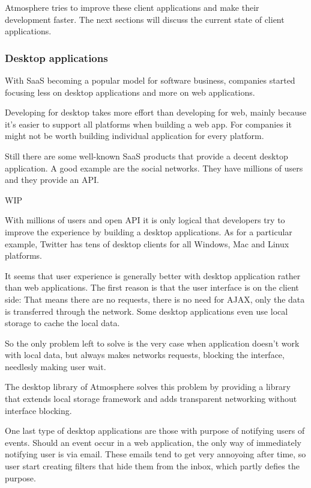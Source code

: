 Atmosphere tries to improve these client applications and make their development faster. The next sections will discuss the current state of client applications.

\subsubsection{Desktop applications}

With SaaS becoming a popular model for software business, companies started focusing less on desktop applications and more on web applications.

Developing for desktop takes more effort than developing for web, mainly because it's easier to support all platforms when building a web app. For companies it might not be worth building individual application for every platform.

Still there are some well-known SaaS products that provide a decent desktop application. A good example are the social networks. They have millions of users and they provide an API.

WIP

With millions of users and open API it is only logical that developers try to improve the experience by building a desktop applications. As for a particular example, Twitter has tens of desktop clients for all Windows, Mac and Linux platforms.

It seems that user experience is generally better with desktop application rather than web applications. The first reason is that the user interface is on the client side: That means there are no requests, there is no need for AJAX, only the data is transferred through the network. Some desktop applications even use local storage to cache the local data.

So the only problem left to solve is the very case when application doesn’t work with local data, but always makes networks requests, blocking the interface, needlesly making user wait. 

The desktop library of Atmosphere solves this problem by providing a library that extends local storage framework and adds transparent networking without interface blocking. 

One last type of desktop applications are those with purpose of notifying users of events. Should an event occur in a web application, the only way of immediately notifying user is via email. These emails tend to get very annoyoing after time, so user start creating filters that hide them from the inbox, which partly defies the purpose.

